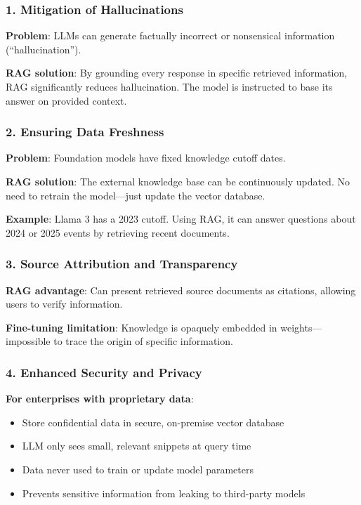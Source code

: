\documentclass{article}
\begin{document}
\subsubsection{1. Mitigation of Hallucinations}

\textbf{Problem}: LLMs can generate factually incorrect or nonsensical information (``hallucination'').

\textbf{RAG solution}: By grounding every response in specific retrieved information, RAG significantly reduces hallucination. The model is instructed to base its answer on provided context.

\subsubsection{2. Ensuring Data Freshness}

\textbf{Problem}: Foundation models have fixed knowledge cutoff dates.

\textbf{RAG solution}: The external knowledge base can be continuously updated. No need to retrain the model---just update the vector database.

\textbf{Example}: Llama 3 has a 2023 cutoff. Using RAG, it can answer questions about 2024 or 2025 events by retrieving recent documents.

\subsubsection{3. Source Attribution and Transparency}

\textbf{RAG advantage}: Can present retrieved source documents as citations, allowing users to verify information.

\textbf{Fine-tuning limitation}: Knowledge is opaquely embedded in weights---impossible to trace the origin of specific information.

\subsubsection{4. Enhanced Security and Privacy}

\textbf{For enterprises with proprietary data}:
\begin{itemize}
\item Store confidential data in secure, on-premise vector database
\item LLM only sees small, relevant snippets at query time
\item Data never used to train or update model parameters
\item Prevents sensitive information from leaking to third-party models
\end{itemize}
\end{document}
